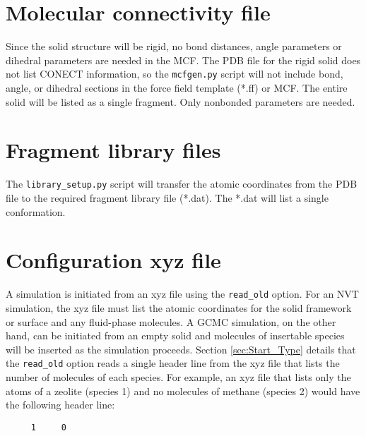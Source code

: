 \section{Molecular connectivity file}\label{sec:solid_mcf}
Since the solid structure will be rigid, no bond distances, angle parameters or dihedral parameters are needed in the MCF.
The PDB file for the rigid solid does not list CONECT information, so the \texttt{mcfgen.py} script will not include bond, 
angle, or dihedral sections in the force field template (*.ff) or MCF. The entire solid will be listed as a single fragment. 
Only nonbonded parameters are needed.

\section{Fragment library files}\label{sec:fragment file}
The \texttt{library\_setup.py} script will transfer the atomic coordinates 
from the PDB file to the required fragment library file (*.dat). 
The *.dat will list a single conformation.

\section{Configuration xyz file}\label{sec:solid_xyz}
A simulation is initiated from an xyz file using the \texttt{read\_old} option. 
For an NVT simulation, the xyz file must list the atomic coordinates for 
the solid framework or surface and any fluid-phase molecules. 
A GCMC simulation, on the other hand, can be initiated from an empty solid and molecules 
of insertable species will be inserted as the simulation proceeds. Section \ref{sec:Start_Type}
details that the \texttt{read\_old} option reads a single header line from the xyz file that lists the number of 
molecules of each species. For example, an xyz file that lists only the atoms of a zeolite (species 1) and 
no molecules of methane (species 2) would have the following header line:

\texttt{
\ \ \ \ 1\ \ \ \ \ 0
}
